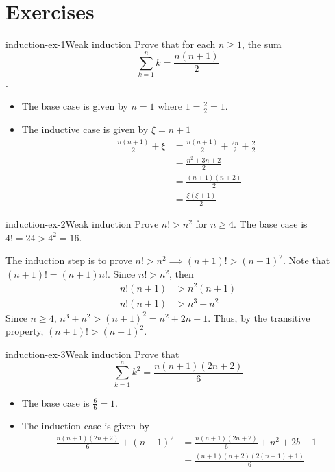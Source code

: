 \documentclass[preview]{standalone}
\begin{document}
\genpage


\section{Exercises}

\begin{snippetexercise}{induction-ex-1}{Weak induction}
    Prove that for each \(n \geq 1\), the sum \[ \sum_{k=1}^n k = \frac{n(n+1)}{2} \].
    \begin{itemize}
        \item The base case is given by \(n=1\) where \(1 = \frac{2}{2} = 1\).
        \item The inductive case is given by \(\xi = n+1\)
        \begin{align*}
            \frac{n(n+1)}{2} + \xi &= \frac{n(n+1)}{2} + \frac{2n}{2} + \frac{2}{2} \\
            &= \frac{n^2 + 3n + 2}{2} \\
            &= \frac{(n+1)(n+2)}{2} \\
            &= \frac{\xi(\xi+1)}{2}
        \end{align*}
    \end{itemize}
\end{snippetexercise}

\begin{snippetexercise}{induction-ex-2}{Weak induction}
    Prove \(n! > n^2\) for \(n \geq 4\).
    The base case is \(4!=24 > 4^2 = 16\).

    The induction step is to prove \(n! > n^2 \implies (n +1)! > {(n+1)}^2\).
    Note that \((n+1)!=(n+1)n!\).
    Since \(n! > n^2\), then
    \begin{align*}
        n!(n+1) &> n^2(n+1) \\
        n!(n+1) &> n^3 + n^2
    \end{align*}
    Since \(n \geq 4\), \(n^3 + n^2 > {(n+1)}^2=n^2+2n+1\).
    Thus, by the transitive property, \((n+1)! > {(n+1)}^2\).
\end{snippetexercise}

\begin{snippetexercise}{induction-ex-3}{Weak induction}
    Prove that
    \[
        \sum_{k=1}^n k^2 = \frac{n(n+1)(2n+2)}{6}
    \]
    \begin{itemize}
        \item The base case is \(\frac{6}{6}=1\).
        \item The induction case is given by
        \begin{align*}
            \frac{n(n+1)(2n+2)}{6} + {(n+1)}^2  &= \frac{n(n+1)(2n+2)}{6} + n^2 + 2b + 1 \\
            &= \frac{(n+1)(n+2)(2(n+1)+1)}{6}
        \end{align*}
    \end{itemize}
\end{snippetexercise}
\end{document}
